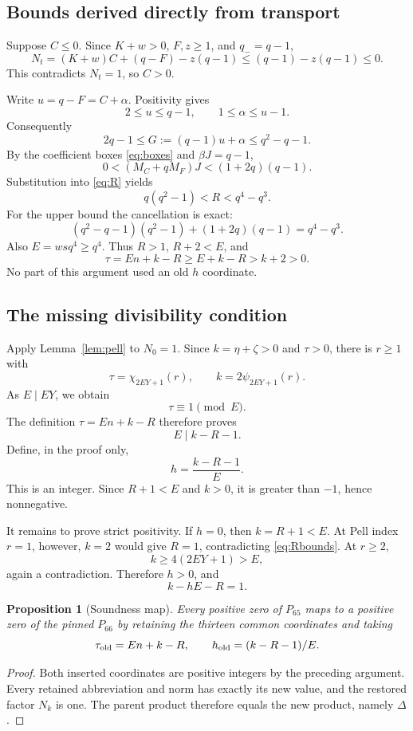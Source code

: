 \documentclass[11pt,letterpaper]{article}
\newtheorem{proposition}[theorem]{Proposition}
\theoremstyle{definition}
\begin{document}
\subsection{Bounds derived directly from transport}

Suppose \(C\le0\). Since \(K+w>0\), \(F,z\ge1\), and \(q_-=q-1\),
\[
 N_t=(K+w)C+(q-F)-z(q-1)
       \le(q-1)-z(q-1)\le0.
\]
This contradicts \(N_t=1\), so \(C>0\).

Write \(u=q-F=C+\alpha\). Positivity gives
\[
 2\le u\le q-1,\qquad 1\le\alpha\le u-1.
\]
Consequently
\[
 2q-1\le G:=(q-1)u+\alpha\le q^2-q-1.
\]
By the coefficient boxes \eqref{eq:boxes} and \(\beta J=q-1\),
\[
 0<(M_C+qM_F)J<(1+2q)(q-1).
\]
Substitution into \eqref{eq:R} yields
\begin{equation}\label{eq:Rbounds}
 q(q^2-1)<R<q^4-q^3.
\end{equation}
For the upper bound the cancellation is exact:
\[
 (q^2-q-1)(q^2-1)+(1+2q)(q-1)=q^4-q^3.
\]
Also \(E=wsq^4\ge q^4\). Thus \(R>1\), \(R+2<E\), and
\begin{equation}\label{eq:taupositive}
 \tau=En+k-R\ge E+k-R>k+2>0.
\end{equation}
No part of this argument used an old \(h\) coordinate.

\subsection{The missing divisibility condition}

Apply Lemma~\ref{lem:pell} to \(N_0=1\). Since \(k=\eta+\zeta>0\)
and \(\tau>0\), there is \(r\ge1\) with
\[
 \tau=\chi_{2EY+1}(r),\qquad k=2\psi_{2EY+1}(r).
\]
As \(E\mid EY\), we obtain
\[
 \tau\equiv1\pmod E.
\]
The definition \(\tau=En+k-R\) therefore proves
\[
 E\mid k-R-1.
\]
Define, in the proof only,
\begin{equation}\label{eq:restoreh}
 h=\frac{k-R-1}{E}.
\end{equation}
This is an integer. Since \(R+1<E\) and \(k>0\), it is greater than
\(-1\), hence nonnegative.

It remains to prove strict positivity. If \(h=0\), then
\(k=R+1<E\). At Pell index \(r=1\), however, \(k=2\) would give
\(R=1\), contradicting \eqref{eq:Rbounds}. At \(r\ge2\),
\[
 k\ge4(2EY+1)>E,
\]
again a contradiction. Therefore \(h>0\), and
\begin{equation}\label{eq:Nkone}
 k-hE-R=1.
\end{equation}

\begin{proposition}[Soundness map]\label{prop:sound}
Every positive zero of \(P_{65}\) maps to a positive zero of the
pinned \(P_{66}\) by retaining the thirteen common coordinates and taking
\[
 \tau_{\rm old}=En+k-R,\qquad h_{\rm old}=(k-R-1)/E.
\]
\end{proposition}
\begin{proof}
Both inserted coordinates are positive integers by the preceding argument.
Every retained abbreviation and norm has exactly its new value, and
the restored factor \(N_k\) is one. The parent product therefore equals
the new product, namely \(\Delta\).
\end{proof}
\end{document}

